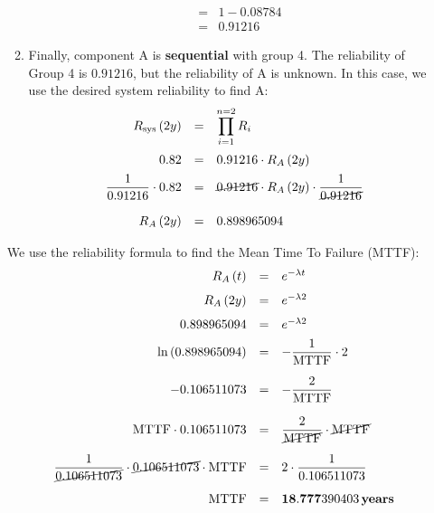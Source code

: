 \begin{enumerate}
\begin{enumerate}[label=Group \arabic*., labelwidth=4em, labelsep=1em, leftmargin=!]
\begin{equation*}
\begin{array}{rcl}
                &=& 1 - 0.08784 \\ [.4em]
                &=& 0.91216
            \end{array}
        \end{equation*}
        \item Finally, component A is \textbf{sequential} with group 4. The reliability of Group 4 is $0.91216$, but the reliability of A is unknown. In this case, we use the desired system reliability to find A:
        \begin{equation*}
            \begin{array}{rcl}
                R_{\text{sys}}\left(2y\right) &=& \displaystyle\prod_{i=1}^{n=2} R_{i} \\ [1.5em]
                0.82 &=& 0.91216 \cdot R_{A}\left(2y\right) \\ [.5em]
                \dfrac{1}{0.91216} \cdot 0.82 &=& \cancel{0.91216} \cdot R_{A}\left(2y\right) \cdot \dfrac{1}{\cancel{0.91216}} \\ [1.5em]
                R_{A}\left(2y\right) &=& 0.898965094
            \end{array}
        \end{equation*}
    \end{enumerate}
    We use the reliability formula to find the Mean Time To Failure (MTTF):
    \begin{equation*}
        \begin{array}{rcl}
            R_{A}\left(t\right) &=& e^{- \lambda t} \\ [.7em]
            R_{A}\left(2y\right) &=& e^{- \lambda 2} \\ [.7em]
            0.898965094 &=& e^{- \lambda 2} \\ [.5em]
            \ln\left(0.898965094\right) &=& - \dfrac{1}{\text{MTTF}} \cdot 2 \\ [1.3em]
            -0.106511073 &=& - \dfrac{2}{\text{MTTF}} \\ [1.5em]
            \text{MTTF} \cdot 0.106511073 &=& \dfrac{2}{\cancel{\text{MTTF}}} \cdot \cancel{\text{MTTF}} \\ [1.3em]
            \dfrac{1}{\cancel{0.106511073}} \cdot \cancel{0.106511073} \cdot \text{MTTF} &=& 2 \cdot \dfrac{1}{0.106511073} \\ [1.3em]
            \text{MTTF} &=& \mathbf{18.777}390403 \, \textbf{years}
        \end{array}
    \end{equation*}


    \newpage



\end{enumerate}
